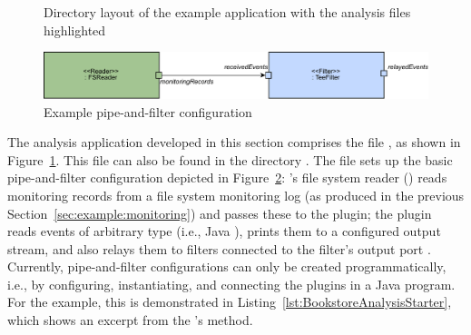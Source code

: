 \begin{figure}[H]
\begin{graybox}
\end{graybox}
\caption{Directory layout of the example application with the analysis files highlighted}
\label{lst:analysisExampleLayout}
\end{figure}

\begin{figure}[t]
\includegraphics[width=\textwidth]{images/ch2-example-pnp}
\caption{Example pipe-and-filter configuration}
\label{fig:example:ch2:pipe-and-filter}
\end{figure}

\noindent The analysis application developed in this section comprises the file %
, as shown in Figure~\ref{lst:analysisExampleLayout}. %
This file can also be found in the directory \dir{\manualInstrumentedBookstoreApplicationDirDistro{}/}.
The file sets up the basic pipe-and-filter configuration depicted in Figure~\ref{fig:example:ch2:pipe-and-filter}: %
\Kieker{}'s file system reader () reads monitoring records %
from a file system monitoring log (as produced in the previous Section~\ref{sec:example:monitoring}) %
and passes these to the  plugin; the  plugin %
reads events of arbitrary type (i.e., Java ), prints them to a %
configured output stream, and also relays them to filters connected to the %
filter's output port . %
Currently, \KiekerAnalysisPart{} pipe-and-filter configurations can only %
be created programmatically, i.e., by configuring, instantiating, and %
connecting the plugins in a Java program. %
For the example, this is demonstrated in Listing~\ref{lst:BookstoreAnalysisStarter}, %
which shows an excerpt from the 's  %
method. %

